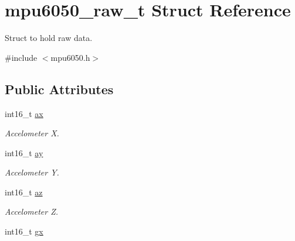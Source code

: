 \hypertarget{structmpu6050__raw__t}{}\section{mpu6050\+\_\+raw\+\_\+t Struct Reference}
\label{structmpu6050__raw__t}


Struct to hold raw data.  




{\ttfamily \#include $<$mpu6050.\+h$>$}

\subsection*{Public Attributes}
\begin{DoxyCompactItemize}
\item 
\hypertarget{structmpu6050__raw__t_a530cd35ae312948515ddfcc7ad19e9c9}{}int16\+\_\+t \hyperlink{structmpu6050__raw__t_a530cd35ae312948515ddfcc7ad19e9c9}{ax}\label{structmpu6050__raw__t_a530cd35ae312948515ddfcc7ad19e9c9}

\begin{DoxyCompactList}\small\item\em Accelometer X. \end{DoxyCompactList}\item 
\hypertarget{structmpu6050__raw__t_a9d01bc32949638804763cd4568f3a143}{}int16\+\_\+t \hyperlink{structmpu6050__raw__t_a9d01bc32949638804763cd4568f3a143}{ay}\label{structmpu6050__raw__t_a9d01bc32949638804763cd4568f3a143}

\begin{DoxyCompactList}\small\item\em Accelometer Y. \end{DoxyCompactList}\item 
\hypertarget{structmpu6050__raw__t_a9fa106008e11463f0400c4005db0d1f7}{}int16\+\_\+t \hyperlink{structmpu6050__raw__t_a9fa106008e11463f0400c4005db0d1f7}{az}\label{structmpu6050__raw__t_a9fa106008e11463f0400c4005db0d1f7}

\begin{DoxyCompactList}\small\item\em Accelometer Z. \end{DoxyCompactList}\item 
\hypertarget{structmpu6050__raw__t_ab05823e31e841a4e4d0fb985ab9a461a}{}int16\+\_\+t \hyperlink{structmpu6050__raw__t_ab05823e31e841a4e4d0fb985ab9a461a}{gx}\label{structmpu6050__raw__t_ab05823e31e841a4e4d0fb985ab9a461a}


\end{DoxyCompactItemize}
